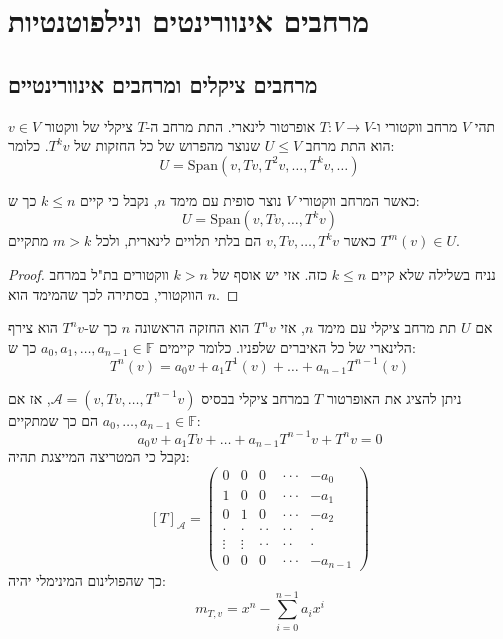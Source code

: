 \documentclass{tstextbook}
\begin{document}
\chapter{מרחבים אינוורינטים ונילפוטנטיות}

\section{מרחבים ציקלים ומרחבים אינוורינטיים}

\begin{definition}
תהי \(V\) מרחב ווקטורי ו-\(T:V\to V\) אופרטור לינארי. התת מרחב ה-\(T\) ציקלי של ווקטור \(v \in V\) הוא התת מרחב \(U\leq V\) שנוצר מהפרוש של כל החזקות של \(T^{k}v\). כלומר:
$$U=\mathrm{Span}\left( v,Tv,T^{2}v, \dots, T^{k}v, \dots \right)$$

\end{definition}
\begin{proposition}
כאשר המרחב ווקטורי \(V\) נוצר סופית עם מימד \(n\), נקבל כי קיים \(k\leq n\) כך ש:
$$U=\mathrm{Span}\left( v,Tv, \dots, T^{k}v \right)$$
כאשר \(v,Tv, \dots, T^{k}v\) הם בלתי תלויים לינארית, ולכל \(m>k\) מתקיים \(T^{m}(v)\in U\).

\end{proposition}
\begin{proof}
נניח בשלילה שלא קיים \(k\leq n\) כזה. אזי יש אוסף של \(k>n\) ווקטורים בת"ל במרחב הווקטורי, בסתירה לכך שהמימד הוא \(n\).

\end{proof}
\begin{corollary}
אם \(U\) תת מרחב ציקלי עם מימד \(n\), אזי \(T^{n}v\) הוא החזקה הראשונה \(n\) כך ש-\(T^{n}v\) הוא צירף הלינארי של כל האיברים שלפניו. כלומר קיימים \(a_{0},a_{1},\dots,a_{n-1}\in \mathbb{F}\) כך ש:
$$T^{n}(v)=a_{0}v+a_{1}T^{1}(v)+ \dots + a_{n-1}T^{n-1}(v)$$

\end{corollary}
\begin{proposition}
ניתן להציג את האופרטור \(T\) במרחב ציקלי בבסיס \(\mathcal{A}=\left( v,Tv, \dots,T^{n-1}v \right)\), אז אם \(a_{0},\dots ,a_{n-1} \in \mathbb{F}\) הם כך שמתקיים:
$$a_{0}v+a_{1}Tv+ \dots + a_{n-1}T^{n-1}v + T^{n}v = 0$$
נקבל כי המטריצה המייצגת תהיה:
$$[T]_{\mathcal{A} }=\begin{pmatrix}0&0&0&\cdot\cdot\cdot&-a_{0}\\ 1&0&0&\cdot\cdot\cdot&-a_{1}\\ 0&1&0&\cdot\cdot\cdot&-a_{2}\\ \cdot&\cdot&\cdot\cdot&\cdot\cdot&\cdot\\ \vdots&\vdots&\cdot\cdot&\cdot\cdot&\cdot\\ 0&0&0&\cdot\cdot\cdot&-a_{n-1}\end{pmatrix}$$
כך שהפולינום המינימלי יהיה:
$$m_{T,v}=x^{n}-\sum_{i=0}^{n-1} a_{i}x^{i}$$

\end{proposition}
\end{document}
